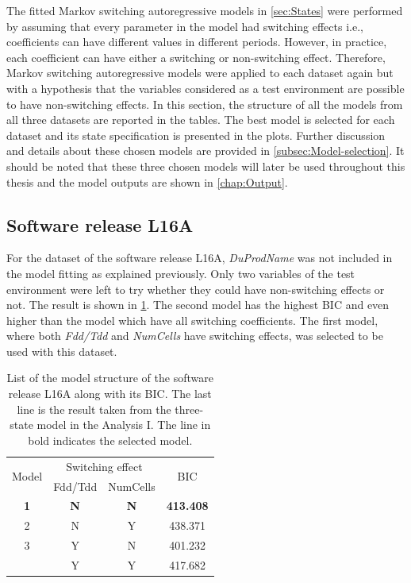 The fitted Markov switching autoregressive models in \ref{sec:States}
were performed by assuming that every parameter in the model had switching
effects i.e., coefficients can have different values in different
periods. However, in practice, each coefficient can have either a
switching or non-switching effect. Therefore, Markov switching autoregressive
models were applied to each dataset again but with a hypothesis that
the variables considered as a test environment are possible to have
non-switching effects. In this section, the structure of all the models
from all three datasets are reported in the tables. The best model
is selected for each dataset and its state specification is presented
in the plots. Further discussion and details about these chosen models
are provided in \ref{subsec:Model-selection}. It should be noted
that these three chosen models will later be used throughout this
thesis and the model outputs are shown in \ref{chap:Output}. 

\subsection{Software release L16A}

For the dataset of the software release L16A, \emph{DuProdName} was
not included in the model fitting as explained previously. Only two
variables of the test environment were left to try whether they could
have non-switching effects or not. The result is shown in \ref{L16A_switch}.
The second model has the highest BIC and even higher than the model
which have all switching coefficients. The first model, where both
\emph{Fdd/Tdd} and \emph{NumCells} have switching effects, was selected
to be used with this dataset. %

\begin{table}[h]
\caption{List of the model structure of the software release L16A along with
its BIC. The last line is the result taken from the three-state model
in the Analysis I. The line in bold indicates the selected model.}
\label{L16A_switch}
\centering{}%
\begin{tabular}{cccc}
\toprule 
\multirow{2}{*}{Model} & \multicolumn{2}{c}{Switching effect} & \multirow{2}{*}{BIC}\tabularnewline
\cmidrule{2-3} 
 & Fdd/Tdd & NumCells & \tabularnewline
\midrule
\midrule 
\textbf{1} & \textbf{N} & \textbf{N} & \textbf{413.408}\tabularnewline
2 & N & Y & 438.371\tabularnewline
3 & Y & N & 401.232\tabularnewline
\midrule
 & Y & Y & 417.682\tabularnewline
\bottomrule
\end{tabular}
\end{table}

